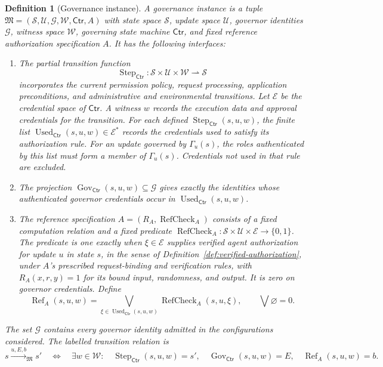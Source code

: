 \documentclass[10pt,letterpaper]{article}
\newtheorem{definition}{Definition}
\newcommand{\G}{\mathcal G}
\newcommand{\Ctr}{\mathsf{Ctr}}
\begin{document}
\begin{definition}[Governance instance]
\label{def:governance-instance}
A governance instance is a tuple $\mathfrak M=(\mathcal S,\mathcal U,\G,\mathcal W,\Ctr,A)$ with state space $\mathcal S$, update space $\mathcal U$, governor identities $\G$, witness space $\mathcal W$, governing state machine $\Ctr$, and fixed reference authorization specification $A$. It has the following interfaces:
\begin{enumerate}[label=(\roman*)]
\item The partial transition function
\[
 \operatorname{Step}_{\Ctr}:\mathcal S\times\mathcal U\times\mathcal W
                         \rightharpoonup\mathcal S
\]
incorporates the current permission policy, request processing, application preconditions, and administrative and environmental transitions. Let $\mathcal E$ be the credential space of $\Ctr$. A witness $w$ records the execution data and approval credentials for the transition. For each defined $\operatorname{Step}_{\Ctr}(s,u,w)$, the finite list $\operatorname{Used}_{\Ctr}(s,u,w)\in\mathcal E^*$ records the credentials used to satisfy its authorization rule. For an update governed by $\Gamma_u(s)$, the roles authenticated by this list must form a member of $\Gamma_u(s)$. Credentials not used in that rule are excluded.
\item The projection $\operatorname{Gov}_{\Ctr}(s,u,w)\subseteq\G$ gives exactly the identities whose authenticated governor credentials occur in $\operatorname{Used}_{\Ctr}(s,u,w)$.
\item The reference specification $A=(R_A,\operatorname{RefCheck}_A)$ consists of a fixed computation relation and a fixed predicate $\operatorname{RefCheck}_A:\mathcal S\times\mathcal U\times\mathcal E\to\{0,1\}$. The predicate is one exactly when $\xi\in\mathcal E$ supplies verified agent authorization for update $u$ in state $s$, in the sense of Definition~\ref{def:verified-authorization}, under $A$'s prescribed request-binding and verification rules, with $R_A(x,r,y)=1$ for its bound input, randomness, and output. It is zero on governor credentials. Define
\[
 \operatorname{Ref}_A(s,u,w)
 =\bigvee_{\xi\in\operatorname{Used}_{\Ctr}(s,u,w)}
          \operatorname{RefCheck}_A(s,u,\xi),
 \qquad \bigvee\varnothing=0.
\]
\end{enumerate}
The set $\G$ contains every governor identity admitted in the configurations considered. The labelled transition relation is
\[
 s\xrightarrow{u,E,b}_{\mathfrak M}s'
 \quad\Longleftrightarrow\quad
 \exists w\in\mathcal W:\quad
 \operatorname{Step}_{\Ctr}(s,u,w)=s',\quad
 \operatorname{Gov}_{\Ctr}(s,u,w)=E,\quad
 \operatorname{Ref}_A(s,u,w)=b.
\]
\end{definition}
\end{document}
